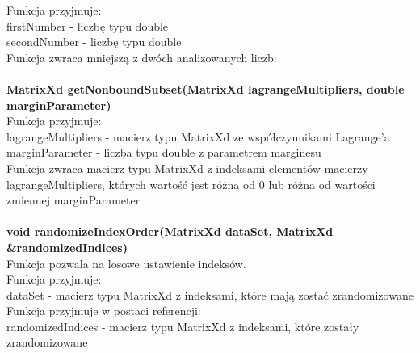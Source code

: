 \documentclass[[10pt,a4paper]{article}
\begin{document}
\vspace{3mm}Funkcja przyjmuje:\\
firstNumber - liczbę typu double\\
secondNumber - liczbę typu double\\
\newline
\vspace{3mm}Funkcja zwraca mniejszą z dwóch analizowanych liczb:\\
\newline
\newline
\newline
{}\\
\newline
\textbf {MatrixXd getNonboundSubset(MatrixXd lagrangeMultipliers, double marginParameter)}\\
\newline
\vspace{3mm}Funkcja przyjmuje:\\
lagrangeMultipliers - macierz typu MatrixXd ze współczynnikami Lagrange'a\\
marginParameter - liczba typu double z parametrem marginesu\\
\newline
\vspace{3mm}Funkcja zwraca macierz typu MatrixXd z indeksami elementów macierzy lagrangeMultipliers, których wartość jest różna od 0 lub różna od wartości zmiennej marginParameter\\
\newline
\newline
\newline
{}\\
\newline
\textbf {void randomizeIndexOrder(MatrixXd dataSet, MatrixXd \&randomizedIndices)}\\
\newline
\vspace{3mm}Funkcja pozwala na losowe ustawienie indeksów.\\
\vspace{3mm}Funkcja przyjmuje:\\
dataSet - macierz typu MatrixXd z indeksami, które mają zostać zrandomizowane\\
\newline
\vspace{3mm}Funkcja przyjmuje w postaci referencji:\\
randomizedIndices - macierz typu MatrixXd z indeksami, które zostały zrandomizowane\\
\end{document}
